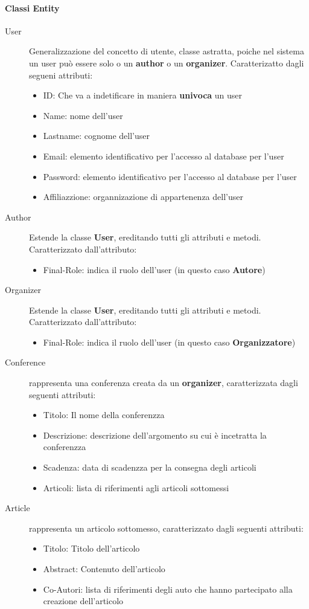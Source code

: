 \paragraph{Classi Entity}
\begin{description}
\item [User] Generalizzazione del concetto di utente, classe astratta, poiche nel sistema un user può essere solo o un \textbf{author} o un \textbf{organizer}. Caratterizatto dagli segueni attributi:
\begin{itemize}
\item ID: Che va a indetificare in maniera \textbf{univoca} un user
\item Name: nome dell'user
\item Lastname: cognome dell'user
\item Email: elemento identificativo per l'accesso al database per l'user
\item Password:  elemento identificativo per l'accesso al database per l'user 
\item Affiliazzione: organnizazione di appartenenza dell'user
\end{itemize}
\item [Author] Estende la classe \textbf{User}, ereditando tutti gli attributi e metodi. Caratterizzato dall'attributo:
\begin{itemize}
\item Final-Role: indica il ruolo dell'user (in questo caso \textbf{Autore})
\end{itemize}
\item [Organizer] Estende la classe \textbf{User}, ereditando tutti gli attributi e metodi. Caratterizzato dall'attributo:
\begin{itemize}
\item Final-Role: indica il ruolo dell'user (in questo caso \textbf{Organizzatore}) 
\end{itemize}
\item [Conference] rappresenta una conferenza creata da un \textbf{organizer}, caratterizzata dagli seguenti attributi:
\begin{itemize}
\item Titolo: Il nome della conferenzza
\item Descrizione: descrizione dell'argomento su cui è incetratta la conferenzza
\item Scadenza: data di scadenzza per la consegna degli articoli
\item Articoli: lista di riferimenti agli articoli sottomessi
\end{itemize}
\item [Article] rappresenta un articolo sottomesso, caratterizzato dagli seguenti attributi:
\begin{itemize}
 \item Titolo: Titolo dell'articolo
\item Abstract: Contenuto dell'articolo
\item Co-Autori: lista di riferimenti degli auto che hanno partecipato alla creazione dell'articolo
\end{itemize}
\end{description}

